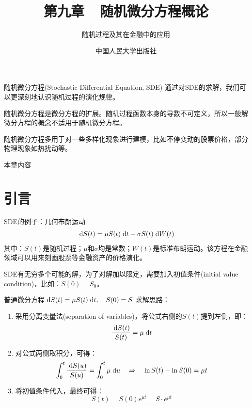 \documentclass[t]{beamer}
\newcommand{\dif}{{\;\rm d}}
\begin{document}
\fontsize{11}{18}\selectfont


\CTEXindent

\title{第九章~~随机微分方程概论}
\author{随机过程及其在金融中的应用}
\date{
	中国人民大学出版社}
\begin{frame}
	\maketitle
\end{frame}

\begin{frame}{随机微分方程(Stochastic Differential Equation, SDE)}
通过对SDE的求解，我们可以更深刻地认识随机过程的演化规律。

随机微分方程是微分方程的扩展。随机过程函数本身的导数不可定义，所以一般解微分方程的概念不适用于随机微分方程。

随机微分方程多用于对一些多样化现象进行建模，比如不停变动的股票价格，部分物理现象如热扰动等。
\end{frame}

\begin{frame}{本章内容}
\tableofcontents

\end{frame}


\section{引言}


\begin{frame}{SDE的例子：几何布朗运动}
\[\dif S(t)=\mu S(t)\dif t+\sigma S(t) \dif W(t)\]
其中：$S(t)$是随机过程；$\mu$和$\sigma$均是常数；$W(t)$是标准布朗运动。该方程在金融领域可以用来刻画股票等金融资产的价格演化。

SDE有无穷多个可能的解，为了对解加以限定，需要加入初值条件(initial value condition)，比如：$S(0)=S_0$。
\end{frame}

\begin{frame}{普通微分方程$\dif S(t)=\mu S(t)\dif t,\quad S(0)=S$}
求解思路：
\begin{enumerate}
\item 采用分离变量法(separation of variables)，将公式右侧的$S(t)$提到左侧，即：
\[\frac{\dif S(t)}{S(t)}=\mu \dif t \]
\item 对公式两侧取积分，可得：
\[\int^t_0\frac{\dif S(u)}{S(u)}=\int^t_0\mu \dif u \quad \Rightarrow\quad \ln S(t)-\ln S(0)=\mu t \]
\item 将初值条件代入，最终可得：
\[S(t)=S(0)e^{\mu t}= S\cdot e^{\mu t}\]
\end{enumerate}
\end{frame}
\end{document}
